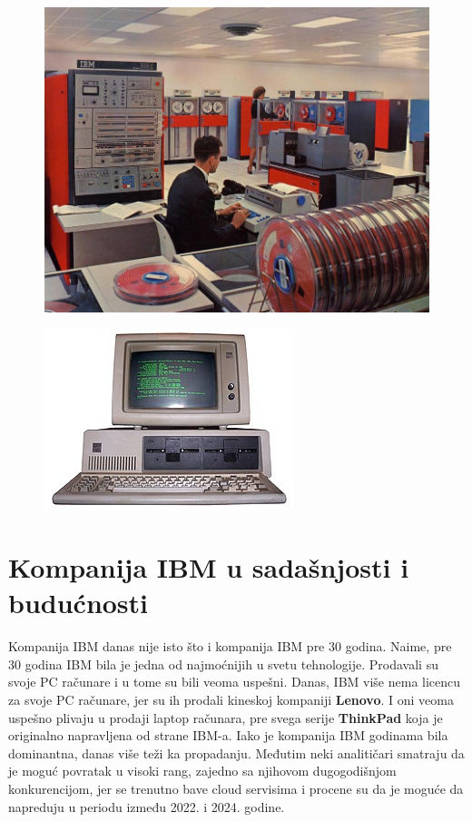\documentclass[a4paper]{article}
\begin{document}
\begin{figure}[!hb]
\centering
\begin{minipage}{.5\textwidth}
  \centering
  \includegraphics[width=.6\linewidth]{sys360.jpg}
  \label{fig:S360}
\end{minipage}%
\begin{minipage}{.5\textwidth}
  \centering
  \includegraphics[width=.6\linewidth]{ibmpc.jpg}
  \label{fig:IBMPC}
\end{minipage}
\end{figure}

\section{Kompanija IBM u sadašnjosti i budućnosti}
Kompanija IBM danas nije isto što i kompanija IBM pre 30 godina. Naime, pre 30 godina IBM bila je jedna od najmoćnijih u svetu tehnologije. Prodavali su svoje PC računare i u tome su bili veoma uspešni.
Danas, IBM više nema licencu za svoje PC računare, jer su ih prodali kineskoj kompaniji \textbf{Lenovo}\cite{lit1}. I oni veoma uspešno plivaju u prodaji laptop računara, pre svega serije \textbf{ThinkPad} koja je originalno napravljena od strane IBM-a. Iako je kompanija IBM godinama bila dominantna, danas više teži ka propadanju. Međutim neki analitičari smatraju da je moguć povratak u visoki rang, zajedno sa njihovom dugogodišnjom konkurencijom, jer se trenutno bave cloud servisima i procene su da je moguće da napreduju u periodu između 2022. i 2024. godine.
\end{document}
